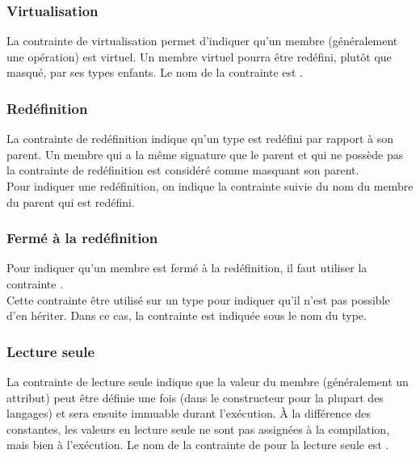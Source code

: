 \subsubsection{Virtualisation}

La contrainte de virtualisation permet d'indiquer qu'un membre (généralement une opération) est virtuel. Un membre virtuel pourra être redéfini, plutôt que masqué, par ses types enfants. Le nom de la contrainte est .

\subsubsection{Redéfinition}

La contrainte de redéfinition indique qu'un type est redéfini par rapport à son parent. Un membre qui a la même signature que le parent et qui ne possède pas la contrainte de redéfinition est considéré comme masquant son parent. \\

Pour indiquer une redéfinition, on indique la contrainte  suivie du nom du membre du parent qui est redéfini.

\subsubsection{Fermé à la redéfinition}

Pour indiquer qu'un membre est fermé à la redéfinition, il faut utiliser la contrainte .\\

Cette contrainte être utilisé sur un type pour indiquer qu'il n'est pas possible d'en hériter. Dans ce cas, la contrainte est indiquée sous le nom du type.

\subsubsection{Lecture seule}

La contrainte de lecture seule indique que la valeur du membre (généralement un attribut) peut être définie une fois (dans le constructeur pour la plupart des langages) et sera ensuite immuable durant l'exécution. À la différence des constantes, les valeurs en lecture seule ne sont pas assignées à la compilation, mais bien à l'exécution. Le nom de la contrainte de pour la lecture seule est .

